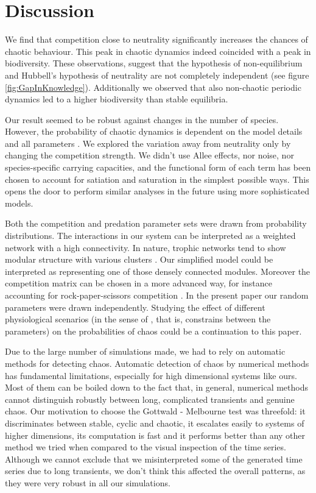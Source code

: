 \section{Discussion}
\label{sec:Discussion}
We find that competition close to neutrality significantly increases the chances of chaotic behaviour. This peak in chaotic dynamics indeed coincided with a peak in biodiversity. These observations, suggest that the hypothesis of non-equilibrium \citep{Huisman1999} and Hubbell's hypothesis of neutrality are not completely independent (see figure \ref{fig:GapInKnowledge}). Additionally we observed that also non-chaotic periodic dynamics  led to a higher biodiversity than stable equilibria.

Our result seemed to be robust against changes in the number of species. However, the probability of chaotic dynamics is dependent on the model details and all parameters \citep{Dakos2009b}. We explored the variation away from neutrality only by changing the competition strength. We didn't use Allee effects, nor noise, nor species-specific carrying capacities, and the functional form of each term has been chosen to account for satiation and saturation in the simplest possible ways. This opens the door to perform similar analyses in the future using more sophisticated models.

Both the competition and predation parameter sets were drawn from probability distributions. The interactions in our system can be interpreted as a weighted network with a high connectivity. In nature, trophic networks tend to show modular structure with various clusters \citep{Thebault2010}. Our simplified model could be interpreted as representing one of those densely connected modules. Moreover the competition matrix can be chosen in a more advanced way, for instance accounting for rock-paper-scissors competition \citep{Huisman2001}. In the present paper our random parameters were drawn independently. Studying the effect of different physiological scenarios (in the sense of \citet{Huisman2001}, that is, constrains between the parameters) on the probabilities of chaos could be a continuation to this paper.

Due to the large number of simulations made, we had to rely on automatic methods for detecting chaos. Automatic detection of chaos by numerical methods has fundamental limitations, especially for high dimensional systems like ours. Most of them can be boiled down to the fact that, in general, numerical methods cannot distinguish robustly between long, complicated transients and genuine chaos. Our motivation to choose the Gottwald - Melbourne test \citep{Gottwald2009} was threefold: it discriminates between stable, cyclic and chaotic, it escalates easily to systems of higher dimensions, its computation is fast and it performs better than any other method we tried when compared to the visual inspection of the time series. Although we cannot exclude that we misinterpreted some of the generated time series due to long transients, we don't think this affected the overall patterns, as they were very robust in all our simulations.


